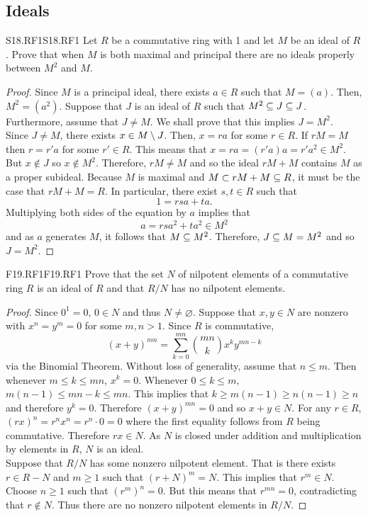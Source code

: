 \documentclass[../AlgebraQualSolutions.tex]{subfiles}
\begin{document}
\subsection{Ideals}

	\begin{prob}{S18.RF1}{S18.RF1}
		Let $R$ be a commutative ring with 1 and let $M$ be an ideal of $R$. Prove that when $M$ is both maximal and principal there are no ideals properly between $M^2$ and $M$.
	\end{prob}

	\begin{proof}
		Since $M$ is a principal ideal, there exists $a \in R$ such that $M = (a)$. Then, $M^2 = (a^2)$. Suppose that $J$ is an ideal of $R$ such that $M^2 \subseteq J \subseteq J$. Furthermore, assume that $J \neq M$. We shall prove that this implies $J = M^2$.\\

		Since $J \neq M$, there exists $x \in M \setminus J$. Then, $x = ra$ for some $r \in R$. If $rM = M$ then $r = r'a$ for some $r' \in R$. This means that $x = ra = (r'a)a = r'a^2 \in M^2$. But $x \not\in J$ so $x \not\in M^2$. Therefore, $rM \neq M$ and so the ideal $rM + M$ contains $M$ as a proper subideal. Because $M$ is maximal and $M \subset rM + M \subseteq R$, it must be the case that $rM + M = R$. In particular, there exist $s,t \in R$ such that
			\[1 = rsa + ta.\]
		Multiplying both sides of the equation by $a$ implies that
			\[a = rsa^2 + ta^2 \in M^2\]
		and as $a$ generates $M$, it follows that $M \subseteq M^2$. Therefore, $J \subseteq M = M^2$ and so $J = M^2$.
	\end{proof}

	\begin{prob}{F19.RF1}{F19.RF1}
	Prove that the set $N$ of nilpotent elements of a commutative ring $R$ is an ideal of $R$ and that $R/N$ has no nilpotent elements.
	\end{prob}
	
	\begin{proof}
	Since $0^1 = 0$, $0 \in N$ and thus $N \neq \varnothing$. Suppose that $x,y \in N$ are nonzero with $x^n = y^m = 0$ for some $m,n > 1$. Since $R$ is commutative,
		\[(x+y)^{mn} = \sum_{k=0}^{mn} {mn \choose k} x^k y^{mn - k} \]
	via the Binomial Theorem. Without loss of generality, assume that $n \leq m$. Then whenever $m \leq k \leq mn$, $x^k = 0$. Whenever $0 \leq k \leq m$, $m(n - 1) \leq mn - k \leq mn$. This implies that $k \geq m(n-1) \geq n(n-1) \geq n$ and therefore $y^k = 0$. Therefore $(x+y)^{mn} = 0$ and so $x + y \in N$. For any $r \in R$, $(rx)^n = r^nx^n = r^n \cdot 0 = 0$ where the first equality follows from $R$ being commutative. Therefore $rx \in N$. As $N$ is closed under addition and multiplication by elements in $R$, $N$ is an ideal.\\
	
	Suppose that $R/N$ has some nonzero nilpotent element. That is there exists $r \in R - N$ and $m \geq 1$ such that $(r+N)^m = N$. This implies that $r^m \in N$. Choose $n \geq 1$  such that $(r^m)^n = 0$. But this means that $r^{mn} = 0$, contradicting that $r \not\in N$. Thus there are no nonzero nilpotent elements in $R/N$.
	\end{proof}
\end{document}
